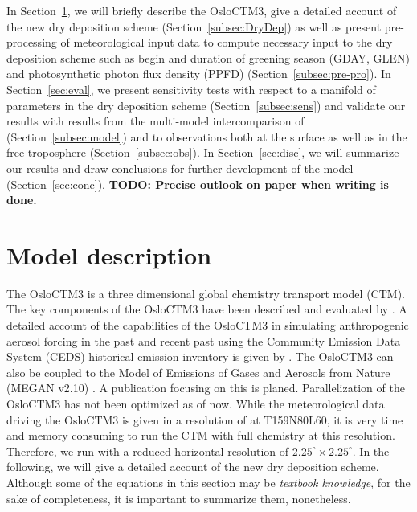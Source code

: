 \documentclass[gmd, manuscript]{copernicus}
\begin{document}
In Section~\ref{sec:model_des}, we will briefly describe the OsloCTM3, give a detailed account of the new dry deposition scheme (Section~\ref{subsec:DryDep}) as well as present pre-processing of meteorological input data to compute necessary input to the dry deposition scheme such as begin and duration of greening season (GDAY, GLEN) and photosynthetic photon flux density (PPFD) (Section~\ref{subsec:pre-pro}). In Section~\ref{sec:eval}, we present sensitivity tests with respect to a manifold of parameters in the dry deposition scheme (Section~\ref{subsec:sens}) and validate our results with results from the multi-model intercomparison of \citet{ACP:Hardacre2015} (Section~\ref{subsec:model}) and to observations both at the surface as well as in the free troposphere (Section~\ref{subsec:obs}). In Section~\ref{sec:disc}, we will summarize our results and draw conclusions for further development of the model (Section~\ref{sec:conc}).
{\bf TODO: Precise outlook on paper when writing is done.}
\section{Model description}
\label{sec:model_des}
The OsloCTM3 is a three dimensional global chemistry transport model (CTM). The key components of the OsloCTM3 have been described and evaluated by \citet{GMD:Sovde2012}. A detailed account of the capabilities of the OsloCTM3 in simulating anthropogenic aerosol forcing in the past and recent past using the Community Emission Data System (CEDS) historical emission inventory \citep{GMD:Hoesly2018} is given by \citet{GMD:Lund2018}. The OsloCTM3 can also be coupled to the Model of Emissions of Gases and Aerosols from Nature (MEGAN v2.10) \citep{ACP:Guenther2006}. A publication focusing on this is planed. Parallelization of the OsloCTM3 has not been optimized as of now. While the meteorological data driving the OsloCTM3 is given in a resolution of at T159N80L60, it is very time and memory consuming to run the CTM with full chemistry at this resolution. Therefore, we run with a reduced horizontal resolution of $2.25^\circ\times2.25^\circ$. In the following, we will give a detailed account of the new dry deposition scheme. Although some of the equations in this section may be \emph{textbook knowledge}, for the sake of completeness, it is important to summarize them, nonetheless.
\end{document}
